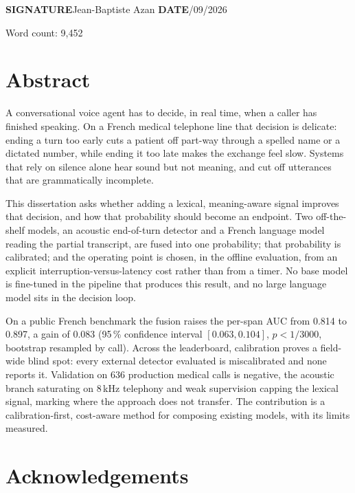 \documentclass[12pt,a4paper]{report} %
\begin{document}
\vspace{0.6cm}
\noindent\textbf{SIGNATURE}\quad Jean-Baptiste Azan \hfill \textbf{DATE}/09/2026

\cleardoublepage

\medskip
Word count: 9,452 %

\section*{Abstract}

A conversational voice agent has to decide, in real time, when a caller has finished
speaking. On a French medical telephone line that decision is delicate: ending a turn too
early cuts a patient off part-way through a spelled name or a dictated number, while ending
it too late makes the exchange feel slow. Systems that rely on silence alone hear sound but not meaning, and cut off utterances that
are grammatically incomplete.

This dissertation asks whether adding a lexical, meaning-aware signal improves that
decision, and how that probability should become an endpoint. Two off-the-shelf models, an acoustic end-of-turn detector and a French
language model reading the partial transcript, are fused into one probability; that
probability is calibrated; and the operating point is chosen, in the offline evaluation, from an explicit
interruption-versus-latency cost rather than from a timer. No base model is fine-tuned in the pipeline that produces this result, and no large language
model sits in the decision loop.

On a public French benchmark the fusion raises the per-span AUC from 0.814 to 0.897, a gain of 0.083 (95\,\% confidence interval $[0.063, 0.104]$, $p < 1/3000$, bootstrap
resampled by call). Across the
leaderboard, calibration proves a field-wide blind spot: every external detector evaluated
is miscalibrated and none reports it. Validation on 636 production medical calls is
negative, the acoustic branch saturating on 8\,kHz telephony and weak supervision capping
the lexical signal, marking where the approach does not transfer. The contribution is a calibration-first, cost-aware method for composing existing models,
with its limits measured.

\cleardoublepage

\section*{Acknowledgements}
\vspace{6mm}
\end{document}
